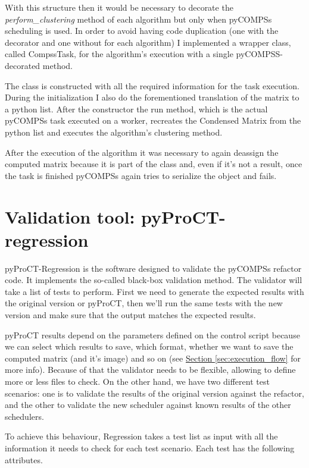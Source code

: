 With this structure then it would be necessary to decorate the \textit{perform\_clustering} method of each algorithm but only when pyCOMPSs scheduling is used. In order to avoid having code duplication (one with the decorator and one without for each algorithm) I implemented a wrapper class, called CompssTask, for the algorithm's execution with a single pyCOMPSS-decorated method.

The class is constructed with all the required information for the task execution. During the initialization I also do the forementioned translation of the matrix to a python list. After the constructor the run method, which is the actual pyCOMPSs task executed on a worker, recreates the Condensed Matrix from the python list and executes the algorithm's clustering method. 

After the execution of the algorithm it was necessary to again deassign the computed matrix because it is part of the class and, even if it's not a result, once the task is finished pyCOMPSs again tries to serialize the object and fails.



\section{Validation tool: pyProCT-regression}
\label{sec:regression}

pyProCT-Regression is the software designed to validate the pyCOMPSs refactor code. It implements the so-called black-box validation method. The validator will take a list of tests to perform. First we need to generate the expected results with the original version or pyProCT, then we'll run the same tests with the new version and make sure that the output matches the expected results.


pyProCT results depend on the parameters defined on the control script because we can select which results to save, which format, whether we want to save the computed matrix (and it's image) and so on (see \hyperref[sec:execution_flow]{Section \ref{sec:execution_flow}} for more info). Because of that the validator needs to be flexible, allowing to define more or less files to check. On the other hand, we have two different test scenarios: one is to validate the results of the original version against the refactor, and the other to validate the new scheduler against known results of the other schedulers.

To achieve this behaviour, Regression takes a test list as input with all the information it needs to check for each test scenario. 
Each test has the following attributes.

